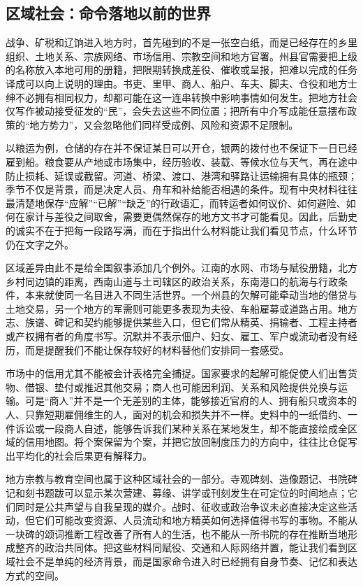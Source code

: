 \subsection{区域社会：命令落地以前的世界}

战争、矿税和辽饷进入地方时，首先碰到的不是一张空白纸，而是已经存在的乡里组织、土地关系、宗族网络、市场信用、宗教空间和地方官署。州县官需要把上级的名称放入本地可用的册籍，把限期转换成差役、催收或呈报，把难以完成的任务译成可以向上说明的理由。书吏、里甲、商人、船户、车夫、脚夫、仓役和地方士绅不必拥有相同权力，却都可能在这一连串转换中影响事情如何发生。把地方社会仅写作被动接受征发的“民”，会失去这些不同位置；把所有中介写成能任意摆布政策的“地方势力”，又会忽略他们同样受成例、风险和资源不足限制。

以粮运为例，仓储的存在并不保证某日可以开仓，银两的拨付也不保证下一日已经雇到船。粮食要从产地或市场集中，经历验收、装载、等候水位与天气，再在途中防止损耗、延误或截留。河道、桥梁、渡口、港湾和驿路让运输拥有具体的瓶颈；季节不仅是背景，而是决定人员、舟车和补给能否相遇的条件。现有中央材料往往最清楚地保存“应解”“已解”“缺乏”的行政语汇，而转运者如何议价、如何避险、如何在家计与差役之间取舍，需要更偶然保存的地方文书才可能看见。因此，后勤史的诚实不在于把每一段路写满，而在于指出什么材料能让我们看见节点，什么环节仍在文字之外。

区域差异由此不是给全国叙事添加几个例外。江南的水网、市场与赋役册籍，北方乡村同边镇的距离，西南山道与土司辖区的政治关系，东南港口的航海与行政条件，本来就使同一名目进入不同生活世界。一个州县的欠解可能牵动当地的借贷与土地交易，另一个地方的军需则可能更多表现为夫役、车船雇募或道路占用。地方志、族谱、碑记和契约能够提供某些入口，但它们常从精英、捐输者、工程主持者或产权拥有者的角度书写。沉默并不表示佃户、妇女、雇工、军户或流动者没有经历，而是提醒我们不能让保存较好的材料替他们安排同一套感受。

市场中的信用尤其不能被会计表格完全捕捉。国家要求的起解可能促使人们出售货物、借银、垫付或推迟其他交易；商人也可能因利润、关系和风险提供兑换与运输。可是“商人”并不是一个无差别的主体，能够接近官府的人、拥有船只或资本的人、只靠短期雇佣维生的人，面对的机会和损失并不一样。史料中的一纸借约、一件诉讼或一段商人自述，能够告诉我们某种关系在某地发生，却不能直接绘成全区域的信用地图。将个案保留为个案，并把它放回制度压力的方向中，往往比仓促写出平均化的社会后果更有解释力。

地方宗教与教育空间也属于这种区域社会的一部分。寺观碑刻、造像题记、书院碑记和刻书题跋可以显示某次营建、募缘、讲学或刊刻发生在可定位的时间地点；它们同时是公共声望与自我呈现的媒介。战时、征收或政治争议未必直接决定这些活动，但它们可能改变资源、人员流动和地方精英如何选择值得书写的事物。不能从一块碑的颂词推断工程改善了所有人的生活，也不能从一所书院的存在推断当地形成整齐的政治共同体。把这些材料同赋役、交通和人际网络并置，能让我们看到区域社会不是单纯的经济背景，而是国家命令进入时已经拥有自身节奏、记忆和表达方式的空间。

